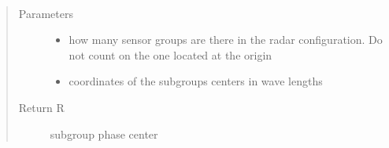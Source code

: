 \documentclass[letterpaper,12pt,english]{sphinxmanual}
\begin{document}
\begin{fulllineitems}
\label{\detokenize{functions:functions.R_cal}}~\begin{quote}\begin{description}
\item[{Parameters}] \leavevmode\begin{itemize}
\item {} 
 \textendash{} how many sensor groups are there in the radar configuration. Do not count on the one located     at the origin

\item {} 
 \textendash{} coordinates of the subgroups centers in wave lengths

\end{itemize}

\item[{Return R}] \leavevmode
subgroup phase center

\end{description}\end{quote}

\end{fulllineitems}

\end{document}
